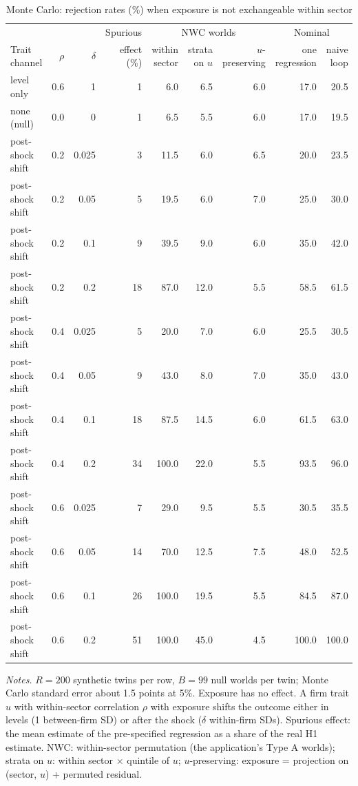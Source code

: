 \begin{table}[!htbp]\centering\footnotesize
\caption{Monte Carlo: rejection rates (\%) when exposure is not exchangeable within sector}\label{tab:v_exch}
\setlength{\tabcolsep}{4.5pt}\begin{tabular}{lrrrrrrrr}
\toprule
 & & & Spurious & \multicolumn{3}{c}{NWC worlds} & \multicolumn{2}{c}{Nominal} \\
\cmidrule(lr){5-7}\cmidrule(lr){8-9}
Trait channel & $\rho$ & $\delta$ & effect (\%) & within sector & strata on $u$ & $u$-preserving & one regression & naive loop \\
\midrule
level only & 0.6 & 1 & 1 & 6.0 & 6.5 & 6.0 & 17.0 & 20.5 \\
none (null) & 0.0 & 0 & 1 & 6.5 & 5.5 & 6.0 & 17.0 & 19.5 \\
post-shock shift & 0.2 & 0.025 & 3 & 11.5 & 6.0 & 6.5 & 20.0 & 23.5 \\
post-shock shift & 0.2 & 0.05 & 5 & 19.5 & 6.0 & 7.0 & 25.0 & 30.0 \\
post-shock shift & 0.2 & 0.1 & 9 & 39.5 & 9.0 & 6.0 & 35.0 & 42.0 \\
post-shock shift & 0.2 & 0.2 & 18 & 87.0 & 12.0 & 5.5 & 58.5 & 61.5 \\
post-shock shift & 0.4 & 0.025 & 5 & 20.0 & 7.0 & 6.0 & 25.5 & 30.5 \\
post-shock shift & 0.4 & 0.05 & 9 & 43.0 & 8.0 & 7.0 & 35.0 & 43.0 \\
post-shock shift & 0.4 & 0.1 & 18 & 87.5 & 14.5 & 6.0 & 61.5 & 63.0 \\
post-shock shift & 0.4 & 0.2 & 34 & 100.0 & 22.0 & 5.5 & 93.5 & 96.0 \\
post-shock shift & 0.6 & 0.025 & 7 & 29.0 & 9.5 & 5.5 & 30.5 & 35.5 \\
post-shock shift & 0.6 & 0.05 & 14 & 70.0 & 12.5 & 7.5 & 48.0 & 52.5 \\
post-shock shift & 0.6 & 0.1 & 26 & 100.0 & 19.5 & 5.5 & 84.5 & 87.0 \\
post-shock shift & 0.6 & 0.2 & 51 & 100.0 & 45.0 & 4.5 & 100.0 & 100.0 \\
\bottomrule
\end{tabular}
\begin{minipage}{0.97\linewidth}\vspace{2pt}\scriptsize\textit{Notes.} $R=200$ synthetic twins per row, $B=99$ null worlds per twin; Monte Carlo standard error about 1.5 points at 5\%. Exposure has no effect. A firm trait $u$ with within-sector correlation $\rho$ with exposure shifts the outcome either in levels (1 between-firm SD) or after the shock ($\delta$ within-firm SDs). Spurious effect: the mean estimate of the pre-specified regression as a share of the real H1 estimate. NWC: within-sector permutation (the application's Type A worlds); strata on $u$: within sector $\times$ quintile of $u$; $u$-preserving: exposure = projection on (sector, $u$) + permuted residual.\end{minipage}
\end{table}